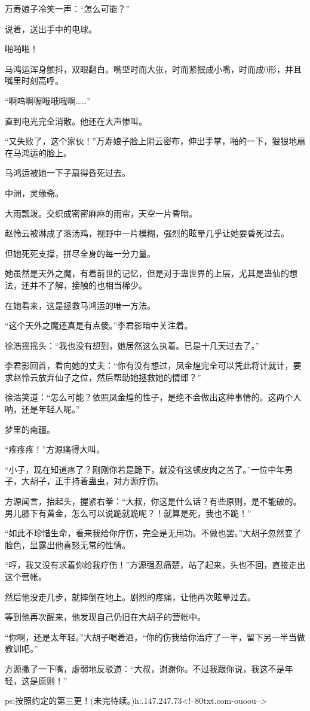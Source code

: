 \begin{this_body}
万寿娘子冷笑一声：“怎么可能？”

说着，送出手中的电球。

啪啪啪！

马鸿运浑身颤抖，双眼翻白。嘴型时而大张，时而紧抿成小嘴，时而成0形，并且嘴里时刻高呼。

“啊呜啊喔哦哦哦啊……”

直到电光完全消散。他还在大声惨叫。

“又失败了，这个家伙！”万寿娘子脸上阴云密布，伸出手掌，啪的一下，狠狠地扇在马鸿运的脸上。

马鸿运被她一下子扇得昏死过去。

中洲，灵缘斋。

大雨瓢泼。交织成密密麻麻的雨帘，天空一片昏暗。

赵怜云被淋成了落汤鸡，视野中一片模糊，强烈的眩晕几乎让她要昏死过去。

但她死死支撑，拼尽全身的每一分力量。

她虽然是天外之魔，有着前世的记忆，但是对于蛊世界的上层，尤其是蛊仙的想法，还并不了解，接触的也相当稀少。

在她看来，这是拯救马鸿运的唯一方法。

“这个天外之魔还真是有点傻。”李君影暗中关注着。

徐浩摇摇头：“我也没有想到，她居然这么执着。已是十几天过去了。”

李君影回首，看向她的丈夫：“你有没有想过，凤金煌完全可以凭此将计就计，要求赵怜云放弃仙子之位，然后帮助她拯救她的情郎？”

徐浩笑道：“怎么可能？依照凤金煌的性子，是绝不会做出这种事情的。这两个人呐，还是年轻人呢。”

梦里的南疆。

“疼疼疼！”方源痛得大叫。

“小子，现在知道疼了？刚刚你若是跪下，就没有这顿皮肉之苦了。”一位中年男子，大胡子，正手持着蛊虫，对方源疗伤。

方源闻言，抬起头，握紧右拳：“大叔，你这是什么话？有些原则，是不能破的。男儿膝下有黄金，怎么可以说跪就跪呢？！就算是死，我也不跪！”

“如此不珍惜生命，看来我给你疗伤，完全是无用功。不做也罢。”大胡子忽然变了脸色，显露出他喜怒无常的性情。

“哼，我又没有求着你给我疗伤！”方源强忍痛楚，站了起来，头也不回，直接走出这个营帐。

然后他没走几步，就摔倒在地上。剧烈的疼痛，让他再次眩晕过去。

等到他再次醒来，他发现自己仍旧在大胡子的营帐中。

“你啊，还是太年轻。”大胡子喝着酒，“你的伤我给你治疗了一半，留下另一半当做教训吧。”

方源撇了一下嘴，虚弱地反驳道：“大叔，谢谢你。不过我跟你说，我这不是年轻，这是原则！”

ps:按照约定的第三更！(未完待续。)h:.147.247.73<!--80txt.com-ouoou-->

\end{this_body}

